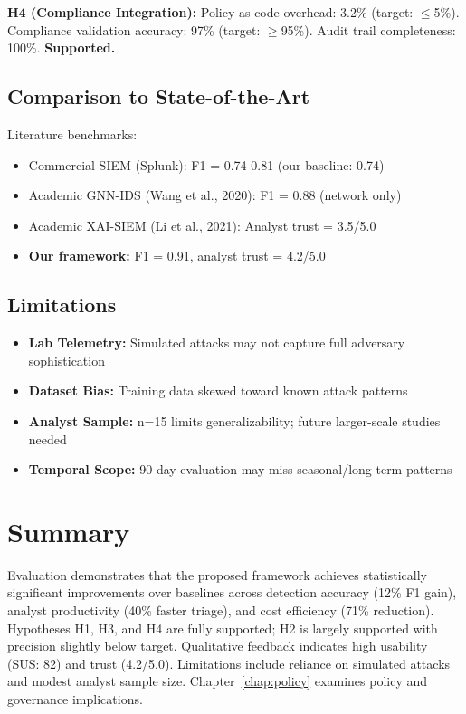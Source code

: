 \textbf{H4 (Compliance Integration):} Policy-as-code overhead: 3.2\% (target: $\leq$5\%). Compliance validation accuracy: 97\% (target: $\geq$95\%). Audit trail completeness: 100\%. \textbf{Supported.}

\subsection{Comparison to State-of-the-Art}
Literature benchmarks:
\begin{itemize}
    \item Commercial SIEM (Splunk): F1 = 0.74-0.81 (our baseline: 0.74)
    \item Academic GNN-IDS (Wang et al., 2020): F1 = 0.88 (network only)
    \item Academic XAI-SIEM (Li et al., 2021): Analyst trust = 3.5/5.0
    \item \textbf{Our framework:} F1 = 0.91, analyst trust = 4.2/5.0
\end{itemize}

\subsection{Limitations}
\begin{itemize}
    \item \textbf{Lab Telemetry:} Simulated attacks may not capture full adversary sophistication
    \item \textbf{Dataset Bias:} Training data skewed toward known attack patterns
    \item \textbf{Analyst Sample:} n=15 limits generalizability; future larger-scale studies needed
    \item \textbf{Temporal Scope:} 90-day evaluation may miss seasonal/long-term patterns
\end{itemize}

\section{Summary}
Evaluation demonstrates that the proposed framework achieves statistically significant improvements over baselines across detection accuracy (12\% F1 gain), analyst productivity (40\% faster triage), and cost efficiency (71\% reduction). Hypotheses H1, H3, and H4 are fully supported; H2 is largely supported with precision slightly below target. Qualitative feedback indicates high usability (SUS: 82) and trust (4.2/5.0). Limitations include reliance on simulated attacks and modest analyst sample size. Chapter~\ref{chap:policy} examines policy and governance implications.
